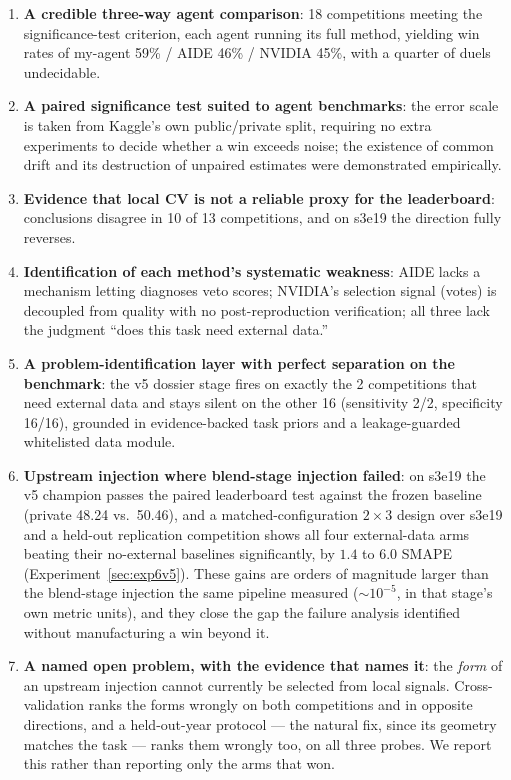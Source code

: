 \documentclass[11pt,a4paper]{article}
\begin{document}
\begin{enumerate}[leftmargin=*]
  \item \textbf{A credible three-way agent comparison}: 18 competitions meeting the significance-test criterion, each agent running its full method, yielding win rates of my-agent 59\% / AIDE 46\% / NVIDIA 45\%, with a quarter of duels undecidable.
  \item \textbf{A paired significance test suited to agent benchmarks}: the error scale is taken from Kaggle's own public/private split, requiring no extra experiments to decide whether a win exceeds noise; the existence of common drift and its destruction of unpaired estimates were demonstrated empirically.
  \item \textbf{Evidence that local CV is not a reliable proxy for the leaderboard}: conclusions disagree in 10 of 13 competitions, and on s3e19 the direction fully reverses.
  \item \textbf{Identification of each method's systematic weakness}: AIDE lacks a mechanism letting diagnoses veto scores; NVIDIA's selection signal (votes) is decoupled from quality with no post-reproduction verification; all three lack the judgment ``does this task need external data.''
  \item \textbf{A problem-identification layer with perfect separation on the benchmark}: the v5 dossier stage fires on exactly the 2 competitions that need external data and stays silent on the other 16 (sensitivity 2/2, specificity 16/16), grounded in evidence-backed task priors and a leakage-guarded whitelisted data module.
  \item \textbf{Upstream injection where blend-stage injection failed}: on s3e19 the v5 champion passes the paired leaderboard test against the frozen baseline (private 48.24 vs.\ 50.46), and a matched-configuration $2\times3$ design over s3e19 and a held-out replication competition shows all four external-data arms beating their no-external baselines significantly, by $1.4$ to $6.0$ SMAPE (Experiment~\ref{sec:exp6v5}). These gains are orders of magnitude larger than the blend-stage injection the same pipeline measured (${\sim}10^{-5}$, in that stage's own metric units), and they close the gap the failure analysis identified without manufacturing a win beyond it.
  \item \textbf{A named open problem, with the evidence that names it}: the \emph{form} of an upstream injection cannot currently be selected from local signals. Cross-validation ranks the forms wrongly on both competitions and in opposite directions, and a held-out-year protocol --- the natural fix, since its geometry matches the task --- ranks them wrongly too, on all three probes. We report this rather than reporting only the arms that won.

\end{enumerate}
\end{document}
